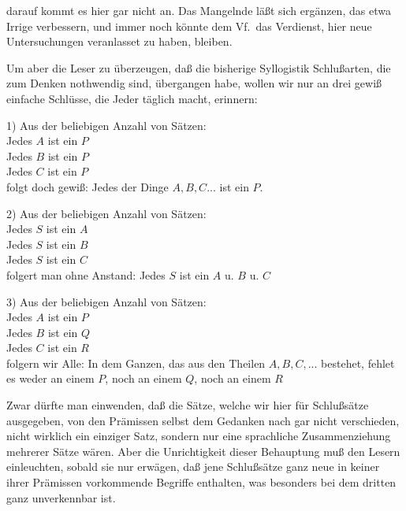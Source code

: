 darauf kommt es hier gar  nicht an. Das Mangelnde läßt sich ergänzen, das etwa Irrige verbessern, und immer noch könnte dem Vf.\ das Verdienst, hier neue Untersuchungen veranlasset zu haben, bleiben. \par
Um aber die Leser zu überzeugen, daß die bisherige Syllogistik Schlußarten, die  zum Denken nothwendig sind, übergangen habe, wollen wir nur an drei gewiß einfache Schlüsse, die Jeder täglich macht, erinnern: \par
1) Aus der beliebigen Anzahl von Sätzen: \\
Jedes $A$ ist ein $P$\\
Jedes $B$ ist ein $P$\\
Jedes $C$ ist ein $P$ \usw\ \\
folgt doch gewiß: Jedes der Dinge $A, B, C ...$ ist ein $P$. \par
2) Aus der beliebigen Anzahl von Sätzen: \\
Jedes $S$ ist ein $A$\\
Jedes $S$ ist ein $B$\\
Jedes $S$ ist ein $C$ \usw\ \\
folgert man ohne Anstand: Jedes $S$ ist ein $A$ u. $B$ u. $C$ \usw\ \par
3) Aus der beliebigen Anzahl von Sätzen: \\
Jedes $A$ ist ein $P$ \\
Jedes $B$ ist ein $Q$ \\
Jedes $C$ ist ein $R$ \usw\ \\
folgern wir Alle: In dem Ganzen, das aus den Theilen $A, B, C,...$ bestehet, fehlet es weder an einem $P$, noch an einem $Q$, noch an einem $R$ \usw\ \par
Zwar dürfte man einwenden, daß die Sätze, welche wir hier für Schlußsätze ausgegeben, von den Prämissen selbst  dem Gedanken nach gar nicht verschieden, nicht wirklich ein einziger Satz, sondern nur eine sprachliche Zusammenziehung mehrerer Sätze wären. Aber die Unrichtigkeit dieser Behauptung muß den Lesern einleuchten, sobald sie nur erwägen, daß jene Schlußsätze ganz neue in keiner ihrer Prämissen vorkommende Begriffe enthalten, was besonders bei dem dritten ganz unverkennbar ist. \par

